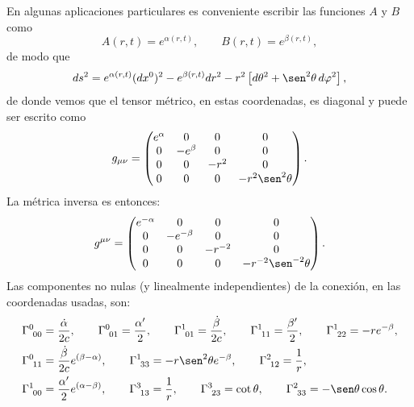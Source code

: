 En algunas aplicaciones particulares es conveniente escribir las funciones
$A$ y $B$ como
\begin{equation}\label{funcionesmetrica}
A(r,t) =e^{\alpha(r,t)}, \qquad B(r,t) =e^{\beta(r,t)},
\end{equation}
de modo que
\begin{equation}\label{ds2_rt}
ds^2=e^{\alpha(r,t)} (dx^0)^2-e^{\beta(r,t)} dr^2-r^2\left[
d\theta^2+\sen^2\theta\, d\varphi^2\right],
\end{equation}
de donde vemos que el tensor métrico, en estas coordenadas, es diagonal y puede
ser escrito como
\begin{equation}
g_{\mu\nu}=%
\begin{pmatrix}
e^\alpha& 0 & 0 & 0\\
0 & -e^\beta & 0 & 0\\
0 & 0 & -r^2 & 0\\
0 & 0 & 0 & -r^2\sen^2\theta
\end{pmatrix}.
\end{equation}
La métrica inversa es entonces:
\begin{equation}
g^{\mu\nu}=%
\begin{pmatrix}
e^{-\alpha} & 0 & 0 & 0\\
0 & -e^{-\beta} & 0 & 0\\
0 & 0 & -r^{-2} & 0\\
0 & 0 & 0 & -r^{-2}\sen^{-2}\theta
\end{pmatrix}.
\end{equation}
Las componentes no nulas (y linealmente independientes) de la conexión, en las
coordenadas usadas, son:
\begin{align}
\Gamma_{\ 00}^0 & =\frac{\dot{\alpha}}{2c}, \qquad
\Gamma_{\ 01}^0 =\frac{\alpha'}{2}, \qquad
\Gamma_{\ 01}^1 =\frac{\dot{\beta}}{2c}, \qquad
\Gamma_{\ 11}^1 =\frac{\beta'}{2}, \qquad
\Gamma_{\ 22}^1 =-re^{-\beta}, \label{gammas1_sch}\\
\Gamma_{\ 11}^0 & =\frac{\dot{\beta}}{2c}e^{(\beta-\alpha)}, \qquad
\Gamma_{\ 33}^1 =-r\sen^2\theta e^{-\beta}, \qquad
\Gamma_{\ 12}^2 =\frac{1}{r},\label{gammas2_sch}\\
\Gamma_{\ 00}^1 & =\frac{\alpha'}{2} e^{(\alpha-\beta)}, \qquad
\Gamma_{\ 13}^3 =\frac{1}{r}, \qquad
\Gamma_{\ 23}^3 =\cot\theta, \qquad
\Gamma_{\ 33}^2 =-\sen\theta\cos\theta .\label{gammas3_sch}
\end{align}

